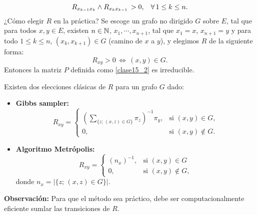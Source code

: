 \[R_{x_{k-1}x_k}\wedge R_{x_kx_{k-1}}\,>0,\hspace{0.3cm}\forall\,1\leq k\leq n.\]
¿Cómo elegir $R$ en la práctica? Se escoge un grafo no dirigido $G$ sobre $E$, tal que para todos $x,y\in E$, existen $n\in \mathbb N$, $x_1,\cdots,x_{n+1}$, tal que $x_1=x$, $x_{n+1}=y$ y para todo $1\leq k\leq n$, $(x_k,x_{k+1})\in G$ (camino de $x$ a $y$), y elegimos $R$ de la siguiente forma:
\[R_{xy} >0\,\Longleftrightarrow\,(x,y)\in G.\]
Entonces la matriz $P$ definida como \ref{clase15_2} es irreducible.\\ \newline

Existen dos elecciones clásicas de $R$ para un grafo $G$ dado:
\begin{itemize}
    \item \textbf{Gibbs sampler: }
    \[R_{xy} = \begin{cases}
                \left(\sum_{\{z;\,(x,z)\in G\}}\pi_z\right)^{-1}\pi_y, & \text{si }(x,y)\in G,\\
                0, & \text{si }(x,y) \notin G.
                \end{cases}\]
    \item \textbf{Algoritmo Metrópolis: }
    \[R_{xy} = \begin{cases}
                (n_x)^{-1}, & \text{si }(x,y)\in G\\
                0, & \text{si }(x,y)\notin G,
                \end{cases}\]
    donde $n_x = |\{z;\,(x,z)\in G\}|$.
\end{itemize}
\textbf{Observación: }Para que el método sea práctico, debe ser computacionalmente eficiente sumlar las transiciones de $R$.\\ \newline

